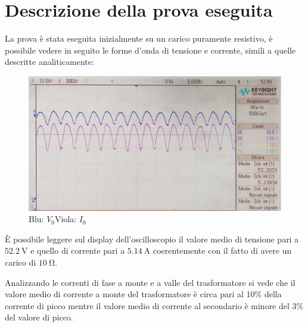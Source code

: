 \documentclass[a4paper,11pt]{article}
\begin{document}
\section{Descrizione della prova eseguita}
La prova è stata eseguita inizialmente su un carico puramente resistivo, 
è possibile vedere in seguito le forme d'onda di tensione e corrente, simili a quelle 
descritte analiticamente:
\begin{figure}[H]
\centering
 \includegraphics[keepaspectratio=true,width=0.9\linewidth]
 {tensione_e_corrente_2_neg.jpg}
 \caption{Blu: \(V_0\)\quad Viola: \(I_0\)}
 \label{fig:tensioni_carico_R}
\end{figure}
È possibile leggere sul display dell'oscilloscopio il valore medio di tensione pari
a $\SI{52.2}{\volt}$ e quello di corrente pari a $\SI{5.14}{\ampere}$ coerentemente
con il fatto di avere un carico di $\SI{10}{\ohm}$.

Analizzando le correnti di fase a monte e a valle del trasformatore si vede che il
valore medio di corrente a monte del trasformatore è circa pari al 10\% della 
corrente di picco mentre il valore medio di corrente al secondario è minore del 3\%
del valore di picco.
\end{document}
